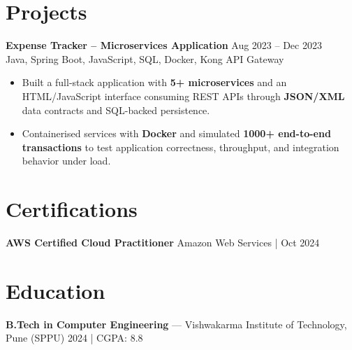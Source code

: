\documentclass[10pt,letterpaper]{article}
\newcommand{\resumeSubheading}[4]{%
  \textbf{#1} \hfill #2 \\
  #3 \hfill #4 \\
}
\begin{document}
\section*{Projects}
\resumeSubheading{Expense Tracker -- Microservices Application}{Aug 2023 -- Dec 2023}{}{Java, Spring Boot, JavaScript, SQL, Docker, Kong API Gateway}
\begin{itemize}
    \item Built a full-stack application with \textbf{5+ microservices} and an HTML/JavaScript interface consuming REST APIs through \textbf{JSON/XML} data contracts and SQL-backed persistence.
    \item Containerised services with \textbf{Docker} and simulated \textbf{1000+ end-to-end transactions} to test application correctness, throughput, and integration behavior under load.
\end{itemize}

\section*{Certifications}
\textbf{AWS Certified Cloud Practitioner} \hfill Amazon Web Services \;|\; Oct 2024

\section*{Education}
\textbf{B.Tech in Computer Engineering} --- Vishwakarma Institute of Technology, Pune (SPPU) \hfill 2024 \;|\; CGPA: 8.8
\end{document}

